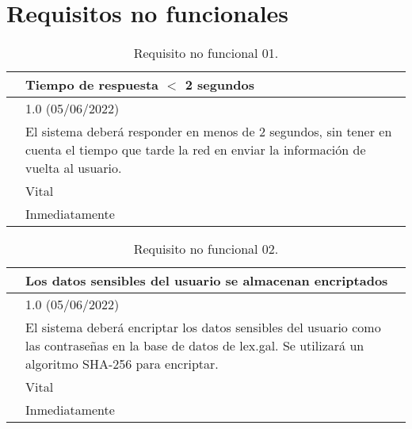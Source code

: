 \section{Requisitos no funcionales}
\label{APRequisitosNoFuncionales}

\begin{table}[H]
\begin{center}
\begin{tabular}{|p{3cm}|p{10cm}|} \hline
\centering {\bf NFR-01} & Tiempo de respuesta $<$ 2 segundos  \\ \hline\hline
\centering {\bf Versión} & 1.0 (05/06/2022) \\ \hline
\centering {\bf Descripción} & El sistema deberá responder en menos de 2 segundos, sin tener en cuenta el tiempo que tarde la red en enviar la información de vuelta al usuario. \\ \hline
\centering {\bf Importancia} & Vital \\ \hline
\centering {\bf Urgencia} & Inmediatamente \\ \hline
\end{tabular}
\caption{Requisito no funcional 01.}
\label{enlaceNFR1}
\end{center}
\end{table}

\begin{table}[H]
\begin{center}
\begin{tabular}{|p{3cm}|p{10cm}|} \hline
\centering {\bf NFR-02} & Los datos sensibles del usuario se almacenan encriptados  \\ \hline\hline
\centering {\bf Versión} & 1.0 (05/06/2022) \\ \hline
\centering {\bf Descripción} & El sistema deberá encriptar los datos sensibles del usuario como las contraseñas en la base de datos de lex.gal. Se utilizará un algoritmo SHA-256 para encriptar. \\ \hline
\centering {\bf Importancia} & Vital \\ \hline
\centering {\bf Urgencia} & Inmediatamente \\ \hline
\end{tabular}
\caption{Requisito no funcional 02.}
\label{enlaceNFR2}
\end{center}
\end{table}


